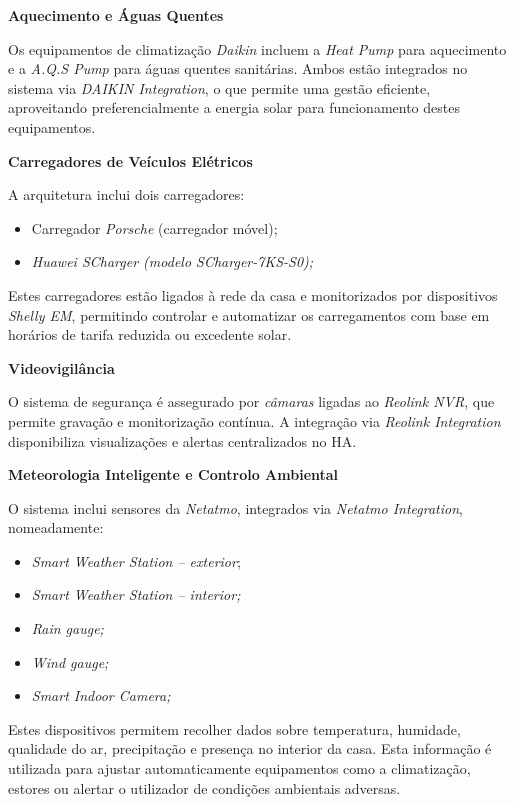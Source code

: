 \textbf{Aquecimento e Águas Quentes}

Os equipamentos de climatização \textit{Daikin} incluem a \textit{Heat Pump} para aquecimento e a \textit{A.Q.S Pump} para águas quentes sanitárias. Ambos estão integrados no sistema via \textit{DAIKIN Integration}, o que permite uma gestão eficiente, aproveitando preferencialmente a energia solar para funcionamento destes equipamentos.

\vspace{1em}
\textbf{Carregadores de Veículos Elétricos}

A arquitetura inclui dois carregadores:
\begin{itemize}
  \item Carregador \textit{Porsche} (carregador móvel);
  \item \textit{Huawei SCharger (modelo SCharger-7KS-S0);}
\end{itemize}

Estes carregadores estão ligados à rede da casa e monitorizados por dispositivos \textit{Shelly EM}, permitindo controlar e automatizar os carregamentos com base em horários de tarifa reduzida ou excedente solar.

\vspace{1em}
\textbf{Videovigilância}

O sistema de segurança é assegurado por \textit{câmaras} ligadas ao \textit{Reolink NVR}, que permite gravação e monitorização contínua. A integração via \textit{Reolink Integration} disponibiliza visualizações e alertas centralizados no \gls{HA}.

\vspace{1em}
\textbf{Meteorologia Inteligente e Controlo Ambiental}

O sistema inclui sensores da \textit{Netatmo}, integrados via \textit{Netatmo Integration}, nomeadamente:

\begin{itemize}
  \item \textit{Smart Weather Station – exterior};
  \item \textit{Smart Weather Station – interior;}
  \item \textit{Rain gauge;}
  \item \textit{Wind gauge;}
  \item \textit{Smart Indoor Camera;}
\end{itemize}

Estes dispositivos permitem recolher dados sobre temperatura, humidade, qualidade do ar, precipitação e presença no interior da casa. Esta informação é utilizada para ajustar automaticamente equipamentos como a climatização, estores ou alertar o utilizador de condições ambientais adversas.

